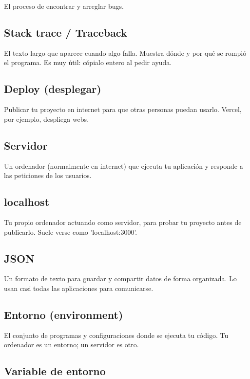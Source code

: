 \documentclass[11pt,a4paper]{report}
\begin{document}
El proceso de encontrar y arreglar bugs.

\subsection{Stack trace / Traceback}

El texto largo que aparece cuando algo falla. Muestra dónde y por qué se rompió el programa. Es muy útil: cópialo entero al pedir ayuda.

\subsection{Deploy (desplegar)}

Publicar tu proyecto en internet para que otras personas puedan usarlo. Vercel, por ejemplo, despliega webs.

\subsection{Servidor}

Un ordenador (normalmente en internet) que ejecuta tu aplicación y responde a las peticiones de los usuarios.

\subsection{localhost}

Tu propio ordenador actuando como servidor, para probar tu proyecto antes de publicarlo. Suele verse como 'localhost:3000'.

\subsection{JSON}

Un formato de texto para guardar y compartir datos de forma organizada. Lo usan casi todas las aplicaciones para comunicarse.

\subsection{Entorno (environment)}

El conjunto de programas y configuraciones donde se ejecuta tu código. Tu ordenador es un entorno; un servidor es otro.

\subsection{Variable de entorno}
\end{document}
